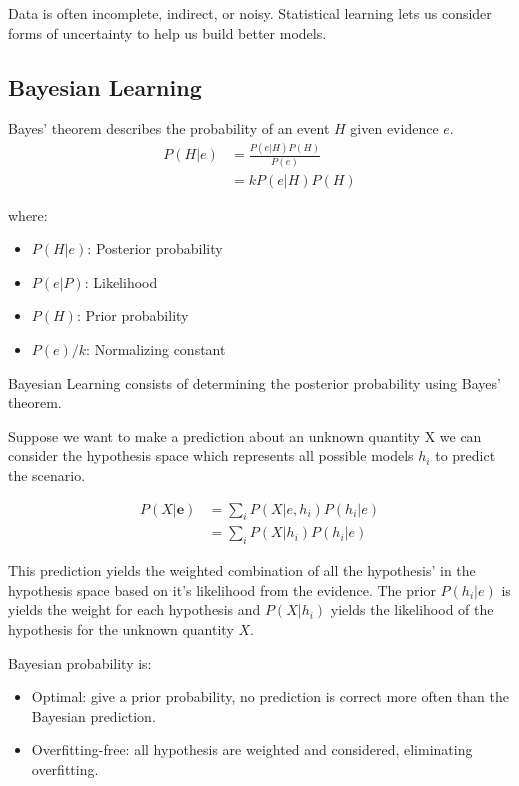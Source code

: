 \documentclass[12pt]{article}
\begin{document}
    Data is often incomplete, indirect, or noisy. Statistical learning lets us consider forms of uncertainty to help us build better models.

    \subsection{Bayesian Learning}
    Bayes' theorem describes the probability of an event $H$ given evidence $e$.
    \begin{align}
        P(H|e) &= \frac{P(e|H)P(H)}{P(e)} \\
        &= kP(e|H)P(H)
    \end{align}

    where:
    \begin{itemize}
        \item $P(H|e)$: Posterior probability
        \item $P(e|P)$: Likelihood
        \item $P(H)$: Prior probability
        \item $P(e)/k$: Normalizing constant
    \end{itemize}

    Bayesian Learning consists of determining the posterior probability using Bayes' theorem.
    
    Suppose we want to make a prediction about an unknown quantity X we can consider the hypothesis space which represents all possible models $h_i$ to predict the scenario.

    \begin{align}
        P(X|\boldsymbol{e}) &= \sum_i P(X|e, h_i)P(h_i|e) \\
        &= \sum_i P(X|h_i)P(h_i|e)
    \end{align}

    This prediction yields the weighted combination of all the hypothesis' in the hypothesis space based on it's likelihood from the evidence. The prior $P(h_i | e)$ is yields the weight for each hypothesis and $P(X|h_i)$ yields the likelihood
    of the hypothesis for the unknown quantity $X$.

    Bayesian probability is:
    \begin{itemize}
        \item Optimal: give a prior probability, no prediction is correct more often than the Bayesian prediction.
        \item Overfitting-free: all hypothesis are weighted and considered, eliminating overfitting.
    \end{itemize}
\end{document}

